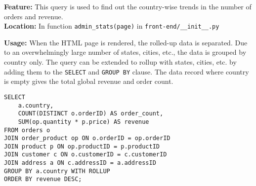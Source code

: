 \textbf{Feature:} This query is used to find out the country-wise trends in the number of orders and revenue. \\
\textbf{Location:} In function \texttt{admin\_stats(page)} in \texttt{front-end/\_\_init\_\_.py}

\textbf{Usage:}
When the HTML page is rendered, the rolled-up data is separated.
Due to an overwhelmingly large number of states, cities, etc., the data is grouped by country only.
The query can be extended to rollup with states, cities, etc. by adding them to the \texttt{SELECT} and \texttt{GROUP BY} clause.
The data record where country is empty gives the total global revenue and order count.

\vspace*{10pt}

\begin{lstlisting}
SELECT
    a.country,
    COUNT(DISTINCT o.orderID) AS order_count,
    SUM(op.quantity * p.price) AS revenue
FROM orders o
JOIN order_product op ON o.orderID = op.orderID
JOIN product p ON op.productID = p.productID
JOIN customer c ON o.customerID = c.customerID
JOIN address a ON c.addressID = a.addressID
GROUP BY a.country WITH ROLLUP
ORDER BY revenue DESC;
\end{lstlisting}